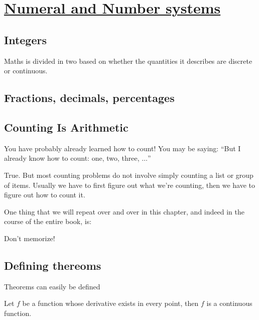 
\label{chap:numbersystems}




\chapter{\protect\hyperlink{chap:\thechapter}{Numeral and Number systems}}


\section{Integers}
Maths is divided in two based on whether the quantities it describes are discrete or continuous.
\section{Fractions, decimals, percentages  }












\section{Counting Is Arithmetic}
You have probably already learned  how to count! You may be saying: “But I already know how to count: one, two, three, $\ldots$”

True. But most counting problems do not involve simply counting a list or group of items. Usually we have to first figure out what we’re counting, then we have to figure out how to count it.

One thing that we will repeat over and over in this chapter, and indeed in the course of the entire book, is:

\begin{claim}
Don’t memorize!
\end{claim}



\section{Defining thereoms}
Theorems can easily be defined
\newtheorem{prop}{Proposition}[section]
\begin{theorem}
Let $f$ be a function whose derivative exists in every point, then $f$ is 
a continuous function.
\end{theorem}

